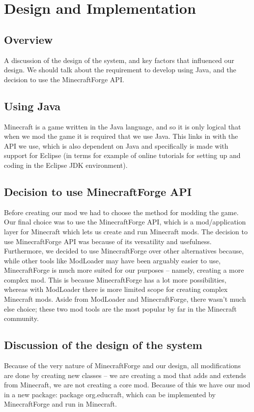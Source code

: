 \chapter{Design and Implementation}

\section{Overview}
A discussion of the design of the system, and key factors that 
influenced our design. We should talk about the requirement to 
develop using Java, and the decision to use the MinecraftForge API.

\section{Using Java}
Minecraft is a game written in the Java language, and so it is 
only logical that when we mod the game it is required that we use 
Java. This links in with the API we use, which is also dependent 
on Java and specifically is made with support for Eclipse (in 
terms for example of online tutorials for setting up and coding 
in the Eclipse JDK environment). 

\section{Decision to use MinecraftForge API}
Before creating our mod we had to choose the method for modding 
the game. Our final choice was to use the MinecraftForge API, which 
is a mod/application layer for Minecraft which lets us create and 
run Minecraft mods. The decision to use MinecraftForge API was 
because of its versatility and usefulness. Furthermore, we decided 
to use MinecraftForge over other alternatives because, while other 
tools like ModLoader may have been arguably easier to use, MinecraftForge 
is much more suited for our purposes – namely, creating a more complex 
mod. This is because MinecraftForge has a lot more possibilities, whereas 
with ModLoader there is more limited scope for creating complex Minecraft 
mods. Aside from ModLoader and MinecraftForge, there wasn’t much else 
choice; these two mod tools are the most popular by far in the Minecraft 
community.  

\section{Discussion of the design of the system}
Because of the very nature of MinecraftForge and our design, 
all modifications are done by creating new classes – we are 
creating a mod that adds and extends from Minecraft, we are 
not creating a core mod. Because of this we have our mod in 
a new package: package org.educraft, which can be implemented 
by MinecraftForge and run in Minecraft. 

